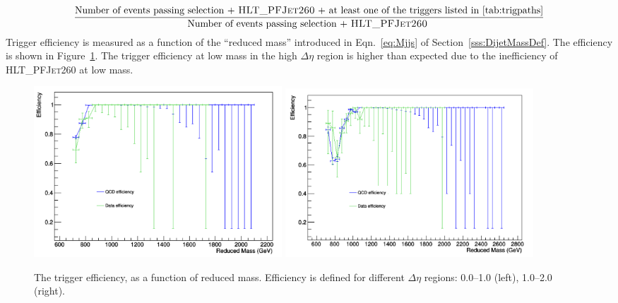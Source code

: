 \begin{equation}
\frac{\text{Number of events passing selection + \textsc{HLT\_PFJet260} + at least one of the triggers listed in~\ref{tab:trigpaths}}}{\text{Number of events passing selection + \textsc{HLT\_PFJet260} }}
\end{equation}
Trigger efficiency is measured as a function of the ``reduced mass'' introduced in Eqn.~\ref{eq:Mjjs} of Section~\ref{sss:DijetMassDef}. The efficiency is shown in Figure~\ref{fig:trigeEffvsMjj_JetHT_DetaBins}. The trigger efficiency at low mass in the high $\Delta\eta$ region is higher than expected due to the inefficiency of \textsc{HLT\_PFJet260} at low mass. 

\begin{figure}[h]
  \begin{center}  
    \includegraphics[width=0.45\textwidth]{F5/trigefDeta0v2.pdf} 
    \includegraphics[width=0.45\textwidth]{F5/trigefDeta1v2.pdf} 

  \end{center}
  \caption{The trigger efficiency, as a function of reduced mass. Efficiency is defined for different $\Delta\eta$ regions: 0.0--1.0 (left), 1.0--2.0 (right).}%
  \label{fig:trigeEffvsMjj_JetHT_DetaBins}
\end{figure}

